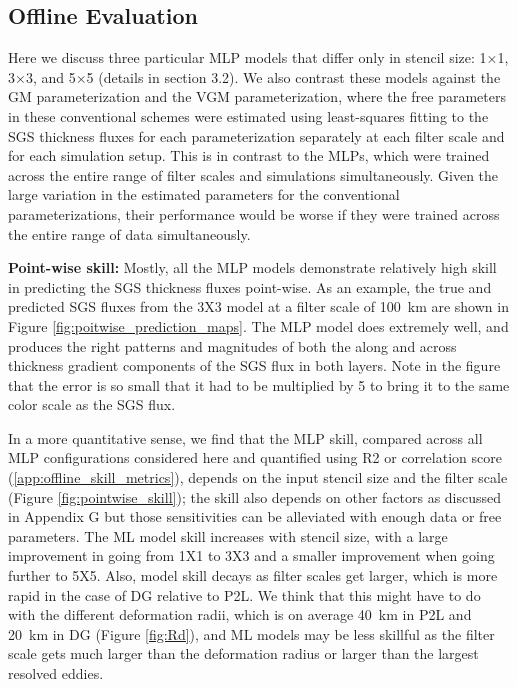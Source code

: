 \documentclass[draft]{agujournal2019}
\begin{document}
\subsection{Offline Evaluation}
Here we discuss three particular MLP models that differ only in stencil size: 1×1, 3×3, and 5×5 (details in section 3.2). We also contrast these models against the GM parameterization and the VGM parameterization, where the free parameters in these conventional schemes were estimated using least-squares fitting to the SGS thickness fluxes for each parameterization separately at each filter scale and for each simulation setup. This is in contrast to the MLPs, which were trained across the entire range of filter scales and simulations simultaneously. Given the large variation in the estimated parameters for the conventional parameterizations, their performance would be worse if they were trained across the entire range of data simultaneously.

\textbf{Point-wise skill:}
Mostly, all the MLP models demonstrate relatively high skill in predicting the SGS thickness fluxes point-wise. As an example, the true and predicted SGS fluxes from the 3X3 model at a filter scale of 100~km are shown in Figure \ref{fig:poitwise_prediction_maps}. The MLP model does extremely well, and produces the right patterns and magnitudes of both the along and across thickness gradient components of the SGS flux in both layers. Note in the figure that the error is so small that it had to be multiplied by 5 to bring it to the same color scale as the SGS flux. 

In a more quantitative sense, we find that the MLP  skill, compared across all MLP configurations considered here and quantified using R2 or correlation score (\ref{app:offline_skill_metrics}), depends on the input stencil size and the filter scale (Figure \ref{fig:pointwise_skill}); the skill also depends on other factors as discussed in Appendix G but those sensitivities can be alleviated with enough data or free parameters. The ML model skill increases with stencil size, with a large improvement in going from 1X1 to 3X3 and a smaller improvement when going further to 5X5. Also, model skill  decays as filter scales get larger, which is more rapid in the case of DG relative to P2L. We think that this might have to do with the different deformation radii, which is on average 40~km in P2L and 20~km in DG (Figure \ref{fig:Rd}), and ML models may be less skillful as the filter scale gets much larger than the deformation radius or larger than the largest resolved eddies. 
\end{document}

